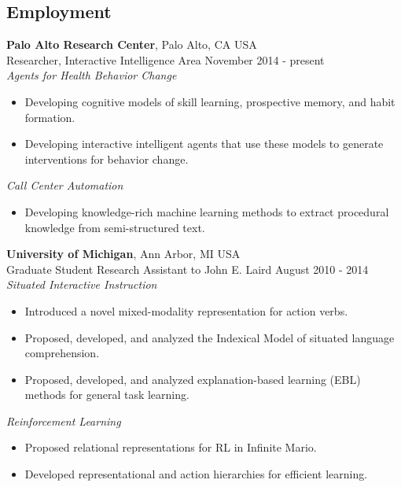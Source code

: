 \documentclass[margin,line,11pt]{res}
\begin{document}
\begin{resume}
          \section{\sc Employment}
                  {\bf Palo Alto Research Center}, Palo Alto, CA USA \\ {Researcher}, Interactive Intelligence Area \hfill November 2014 - present \\
                 \emph{Agents for Health Behavior Change}
                  \begin{itemize}
                    \item Developing cognitive models of skill
                      learning, prospective memory, and habit formation.
                    \item Developing interactive intelligent agents
                      that use these models to generate interventions
                      for behavior change.
                      \end{itemize}
                    
                  \emph{Call Center Automation}
                  \begin{itemize}
                  \item Developing knowledge-rich machine learning methods to extract procedural knowledge from semi-structured text.
                  \end{itemize}
                  
                  {\bf University of Michigan}, Ann Arbor, MI USA \\ {Graduate Student Research Assistant} to John E. Laird \hfill August 2010 - 2014 \\
                  \emph{Situated Interactive Instruction}
                  \begin{itemize}
                  \item Introduced a novel mixed-modality representation for action verbs. 
                    \item Proposed, developed, and analyzed the Indexical Model of situated language comprehension. 
                    \item Proposed, developed, and analyzed explanation-based learning (EBL) methods for general task learning. 
                  \end{itemize}

                  \emph{Reinforcement Learning}
                  \begin{itemize}
                  \item Proposed relational representations for RL in Infinite Mario.
                  \item Developed representational and action hierarchies for efficient learning. 
                  \end{itemize}


\end{resume}
\end{document}

